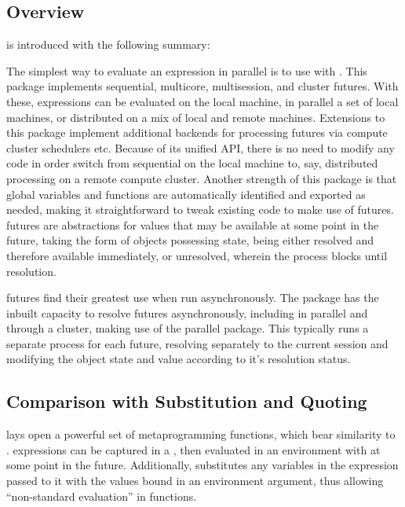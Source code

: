 \subsection{Overview}\label{sec:future-overview}

 is introduced with the following summary:


The simplest way to evaluate an expression in parallel is to use
 with . This package
implements sequential, multicore, multisession, and cluster futures.
With these, \R expressions can be evaluated on the local machine, in
parallel a set of local machines, or distributed on a mix of local and
remote machines. Extensions to this package implement additional
backends for processing futures via compute cluster schedulers etc.
Because of its unified API, there is no need to modify any code in order
switch from sequential on the local machine to, say, distributed
processing on a remote compute cluster. Another strength of this package
is that global variables and functions are automatically identified and
exported as needed, making it straightforward to tweak existing code to
make use of futures\cite{bengtsson20}. futures are abstractions for
values that may be available at some point in the future, taking the
form of objects possessing state, being either resolved and therefore
available immediately, or unresolved, wherein the process blocks until
resolution.

futures find their greatest use when run asynchronously. The 
package has the inbuilt capacity to resolve futures asynchronously,
including in parallel and through a cluster, making use of the parallel
package. This typically runs a separate process for each future,
resolving separately to the current \R session and modifying the object
state and value according to it's resolution status.

\subsection{Comparison with Substitution and Quoting}\label{subsec:comparison-with-non}

\R lays open a powerful set of metaprogramming functions, which bear
similarity to . \R expressions can be captured in a , then evaluated in an
environment with  at some point
in the future. Additionally,  substitutes any variables
in the expression passed to it with the values bound in an environment
argument, thus allowing ``non-standard evaluation'' in functions.

